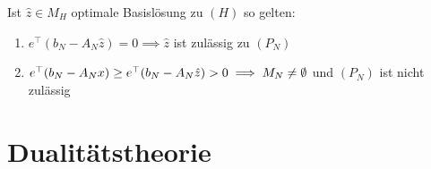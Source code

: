 Ist \(\hat z \in M_H\) optimale Basislösung zu \((H)\) so gelten:

\begin{enumerate}[label=(\alph*)]
	\item \(e^\top (b_N - A_N \hat z) = 0 \implies \hat z\) ist zulässig zu \((P_N)\) 
	\item \(e^\top (b_N - A_N x) \geq e^\top (b_N - A_N \hat z) > 0 \\ \implies M_N \neq \emptyset\) und \((P_N)\) ist nicht zulässig
\end{enumerate}

\section*{Dualitätstheorie}
